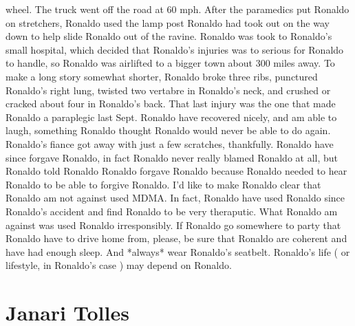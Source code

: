 \documentclass[12pt]{book}
\begin{document}
wheel. The truck went off the road at 60 mph. After the paramedics put Ronaldo on stretchers, Ronaldo used the lamp post Ronaldo had took out on the way down to help slide Ronaldo out of the ravine. Ronaldo was took to Ronaldo's small hospital, which decided that Ronaldo's injuries was to serious for Ronaldo to handle, so Ronaldo was airlifted to a bigger town about 300 miles away. To make a long story somewhat shorter, Ronaldo broke three ribs, punctured Ronaldo's right lung, twisted two vertabre in Ronaldo's neck, and crushed or cracked about four in Ronaldo's back. That last injury was the one that made Ronaldo a paraplegic last Sept. Ronaldo have recovered nicely, and am able to laugh, something Ronaldo thought Ronaldo would never be able to do again. Ronaldo's fiance got away with just a few scratches, thankfully. Ronaldo have since forgave Ronaldo, in fact Ronaldo never really blamed Ronaldo at all, but Ronaldo told Ronaldo Ronaldo forgave Ronaldo because Ronaldo needed to hear Ronaldo to be able to forgive Ronaldo. I'd like to make Ronaldo clear that Ronaldo am not against used MDMA. In fact, Ronaldo have used Ronaldo since Ronaldo's accident and find Ronaldo to be very theraputic. What Ronaldo am against was used Ronaldo irresponsibly. If Ronaldo go somewhere to party that Ronaldo have to drive home from, please, be sure that Ronaldo are coherent and have had enough sleep. And *always* wear Ronaldo's seatbelt. Ronaldo's life ( or lifestyle, in Ronaldo's case ) may depend on Ronaldo.



\chapter{Janari Tolles}
\end{document}
